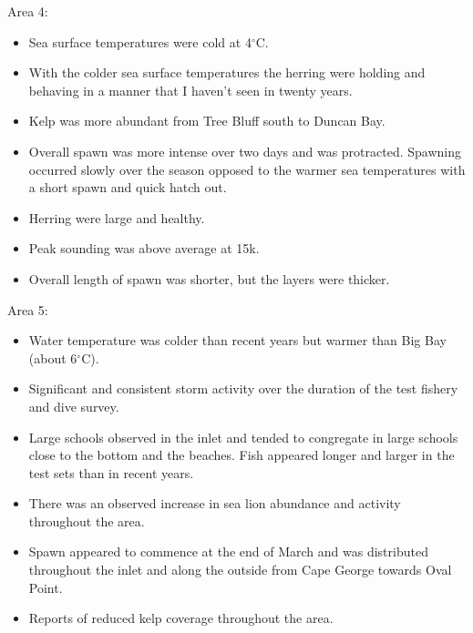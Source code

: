 Area 4:

\begin{itemize}

\item Sea surface temperatures were cold at 4$^\circ\text{C}$.

\item With the colder sea surface temperatures the herring were holding and
behaving in a manner that I haven't seen in twenty years.

\item Kelp was more abundant from Tree Bluff south to Duncan Bay. 

\item Overall spawn was more intense over two days and was protracted.
Spawning occurred slowly over the season opposed to the warmer sea temperatures with a short spawn and quick hatch out.

\item Herring were large and healthy.

\item Peak sounding was above average at 15k.

\item Overall length of spawn was shorter, but the layers were thicker.

\end{itemize}

Area 5:

\begin{itemize}

\item Water temperature was colder than recent years but warmer than Big Bay (about 6$^\circ\text{C}$).

\item Significant and consistent storm activity over the duration of the test fishery and dive survey.

\item Large schools observed in the inlet and tended to congregate in large schools
close to the bottom and the beaches.
Fish appeared longer and larger in the test sets than in recent years.

\item There was an observed increase in sea lion abundance and activity throughout the area.

\item Spawn appeared to commence at the end of March and was distributed
throughout the inlet and along the outside from Cape George towards Oval Point.

\item Reports of reduced kelp coverage throughout the area.

\end{itemize}